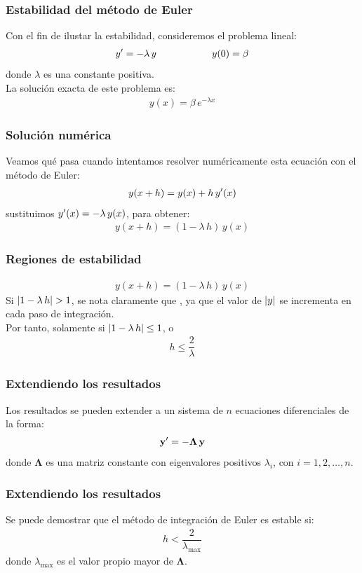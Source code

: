 \documentclass[12pt]{beamer}
\begin{document}
\begin{frame}
\frametitle{Estabilidad del método de Euler}
Con el fin de ilustar la estabilidad, consideremos el problema lineal:
\pause
\begin{align*}
{y}^{\prime} = - \lambda \, y \hspace{2cm} y (0) = \beta
\end{align*}
donde $\lambda$ es una constante positiva.
\\
\medskip
\pause
La solución exacta de este problema es:
\pause
\begin{align*}
y (x) = \beta \, e^{- \lambda x}
\end{align*}
\end{frame}
\begin{frame}
\frametitle{Solución numérica}
Veamos qué pasa cuando intentamos resolver numéricamente esta ecuación con el método de Euler:
\pause
\begin{align*}
y (x + h) = y (x) + h \, {y}^{\prime} (x)
\end{align*}
\pause
sustituimos ${y}^{\prime} (x) = - \lambda \, y (x)$, para obtener:
\pause
\begin{align*}
y (x + h) = (1 - \lambda \, h) \, y (x)
\end{align*}
\end{frame}
\begin{frame}
\frametitle{Regiones de estabilidad}
\begin{align*}
y (x + h) = (1 - \lambda \, h) \, y (x)
\end{align*}
Si $\abs{1 - \lambda \, h} > 1$, se nota claramente que , \pause ya que el valor de $\abs{y}$ se incrementa en cada paso de integración.
\\
\medskip
\pause
Por tanto, \pause {} solamente si $\abs{1 - \lambda \, h} \leq 1$, o
\begin{align*}
h \leq \dfrac{2}{\lambda}
\end{align*}
\end{frame}
\begin{frame}
\frametitle{Extendiendo los resultados}
Los resultados se pueden extender a un sistema de $n$ ecuaciones diferenciales de la forma:
\pause
\begin{align*}
\mathbf{{y}^{\prime}} = - \mathbf{\Lambda \, y}
\end{align*}
donde $\mathbf{\Lambda}$ es una matriz constante con eigenvalores positivos $\lambda_{i}$, con $i = 1, 2, \ldots, n$.
\end{frame}
\begin{frame}
\frametitle{Extendiendo los resultados}
Se puede demostrar que el método de integración de Euler es estable si:
\pause
\begin{align*}
h < \dfrac{2}{\lambda_{\text{max}}}
\end{align*}
donde $\lambda_{\text{max}}$ es el valor propio mayor de $\mathbf{\Lambda}$.
\end{frame}
\end{document}

